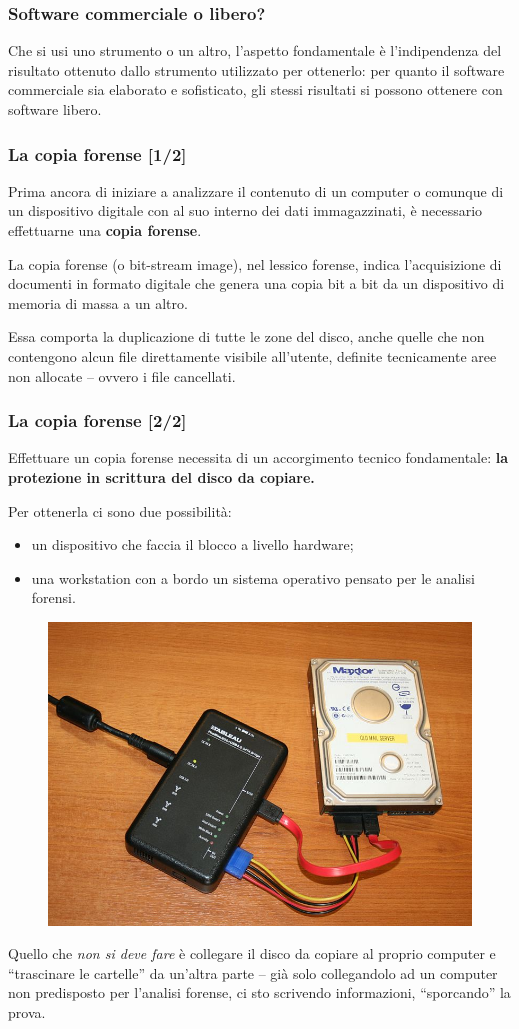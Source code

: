 \documentclass[11pt]{beamer}
\begin{document}
	\begin{frame}
		\frametitle{Software commerciale o libero?}
		Che si usi uno strumento o un altro, l'aspetto fondamentale è l'indipendenza del risultato ottenuto dallo strumento utilizzato per ottenerlo: per quanto il software commerciale sia elaborato e sofisticato, gli stessi risultati si possono ottenere con software libero.
	\end{frame}
	
	
	\begin{frame}
		\frametitle{La copia forense [1/2]}
		Prima ancora di iniziare a analizzare il contenuto di un computer o comunque di un dispositivo digitale con al suo interno dei dati immagazzinati, è necessario effettuarne una \textbf{copia forense}.
		
		\vfill
		La copia forense (o bit-stream image), nel lessico forense, indica l'acquisizione di documenti in formato digitale che genera una copia bit a bit da un dispositivo di memoria di massa a un altro.\cite{wiki:Copia_forense}
		
		\vfill
		
		Essa comporta la duplicazione di tutte le zone del disco, anche quelle che non contengono alcun file direttamente visibile all'utente, definite tecnicamente aree non allocate -- ovvero i file cancellati.
			
	\end{frame}
	
	\begin{frame}[shrink]
		\frametitle{La copia forense [2/2]}
		Effettuare un copia forense necessita di un accorgimento tecnico fondamentale: \textbf{la protezione in scrittura del disco da copiare.}
		
		Per ottenerla ci sono due possibilità:
		\begin{itemize}
			\item un dispositivo che faccia il blocco a livello hardware;
			\item una workstation con a bordo un sistema operativo pensato per le analisi forensi.
		\end{itemize}
		
		\begin{figure}
			\centering
			\includegraphics[width=0.25\linewidth]{pics/800px-Portable_forensic_tableau}
		
			\label{fig:800px-Portable_forensic_tableau}
		\end{figure}
		Quello che \emph{non si deve fare} è collegare il disco da copiare al proprio computer e ``trascinare le cartelle'' da un'altra parte -- già solo collegandolo ad un computer non predisposto per l'analisi forense, ci sto scrivendo informazioni, ``sporcando'' la prova.
				
	\end{frame}
	
\end{document}
